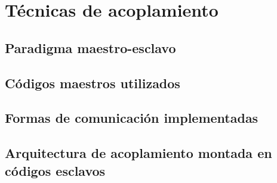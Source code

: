 \chapter{Técnicas de acoplamiento}

\section{Paradigma maestro-esclavo}
\label{2:maestro-esclavo}

\section{Códigos maestros utilizados}
\label{2:maestros}

\section{Formas de comunicación implementadas}
\label{2:comunicación}

\section{Arquitectura de acoplamiento montada en códigos esclavos}
\label{2:arquitectura}
